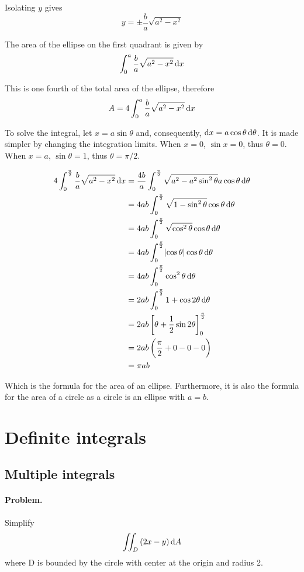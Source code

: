 \documentclass[12pt, oneside]{book}
\begin{document}
Isolating \(y\) gives
\[y = \pm \frac{b}{a} \sqrt{a^2 - x^2}\]

The area of the ellipse on the first quadrant is given by
\[\int_{0}^{a} \frac{b}{a} \sqrt{a^2 - x^2} \dif x\]

This is one fourth of the total area of the ellipse, therefore
\[A = 4 \int_{0}^{a} \frac{b}{a} \sqrt{a^2 - x^2} \dif x\]

To solve the integral, let \(x = a\sin\theta\) and, consequently, \(\dif x = a
\cos \theta \dif \theta\). It is made simpler by changing the integration
limits. When \(x = 0\), \(\sin x = 0\), thus \(\theta = 0\). When \(x = a\),
\(\sin \theta = 1\), thus \(\theta = \pi / 2\).

\begin{align*}
    4 \int_{0}^{\frac{\pi}{2}} \frac{b}{a} \sqrt{a^2 - x^2} \dif x
    &= \frac{4b}{a} \int_{0}^{\frac{\pi}{2}} \sqrt{a^2 - a^2 \sin^2 \theta} a \cos \theta \dif \theta \\
    &= 4ab \int_{0}^{\frac{\pi}{2}} \sqrt{1 - \sin^2 \theta} \cos \theta \dif \theta \\
    &= 4ab \int_{0}^{\frac{\pi}{2}} \sqrt{\cos^2 \theta} \cos \theta \dif \theta \\
    &= 4ab \int_{0}^{\frac{\pi}{2}} \abs{\cos \theta} \cos \theta \dif \theta \\
    &= 4ab \int_{0}^{\frac{\pi}{2}} \cos^2 \theta \dif \theta \\
    &= 2ab \int_{0}^{\frac{\pi}{2}} 1 + \cos {2 \theta} \dif \theta \\
    &= 2ab \left[ \theta + \frac{1}{2} \sin {2 \theta} \right]_{0}^{\frac{\pi}{2}} \\
    &= 2ab \left(\frac{\pi}{2} + 0 - 0 - 0\right) \\
    &= \pi a b
\end{align*}

Which is the formula for the area of an ellipse. Furthermore, it is also the
formula for the area of a circle as a circle is an ellipse with \(a = b\).

\section{Definite integrals}
\subsection{Multiple integrals}
\paragraph{Problem.} Simplify
\[\iint_D {\left(2x - y\right) \dif A}\]
where D is bounded by the circle with center at the origin and radius 2.
\end{document}
